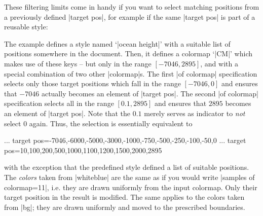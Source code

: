 {\begin{enumerate}
\begin{pgfplotskeylist}
            These filtering limits come in handy if you want to select matching
            positions from a previously defined |target pos|, for example if
            the same |target pos| is part of a reusable style:
\begin{codeexample}[width=8cm]
\pgfplotscolorbardrawstandalone[
  point meta min=-7046,
  point meta max=2895,
  colormap={whiteblue}{color=(blue) color=(white)},
  colormap={gb}{color=(green) color=(yellow)
      color=(brown)},
  colormap={CM}{
      of colormap={
        whiteblue,
        ocean height,
        target pos min*=
          \pgfkeysvalueof{/pgfplots/point meta min},
        target pos max=0,
        sample for=const,
      },
      of colormap={
        gb,
        ocean height,
        target pos min=0.1,
        target pos max*=
          \pgfkeysvalueof{/pgfplots/point meta max},
        sample for=const,
      },
  },
  colorbar horizontal,
  colormap access=const]
\end{codeexample}
            \noindent The example defines a style named `|ocean height|' with a
            suitable list of positions somewhere in the document. Then, it
            defines a colormap `|CM|' which makes use of these keys -- but only
            in the range $[-7046,2895]$, and with a special combination of two
            other |colormap|s. The first |of colormap| specification selects
            only those target positions which fall in the range $[-7046,0]$ and
            ensures that $-7046$ actually becomes an element of |target pos|.
            The second |of colormap| specification selects all in the range
            $[0.1,2895]$ and ensures that $2895$ becomes an element of
            |target pos|. Note that the $0.1$ merely serves as indicator to
            \emph{not} select $0$ again. Thus, the selection is essentially
            equivalent to
\begin{codeexample}
...
target pos={-7046,-6000,-5000,-3000,-1000,-750,-500,-250,-100,-50,0}
...
target pos={10,100,200,500,1000,1100,1200,1500,2000,2895}
\end{codeexample}
            with the exception that the predefined style defined a list of
            suitable positions. The \emph{colors} taken from |whiteblue| are
            the same as if you would write |samples of colormap={11}|, i.e.\@
            they are drawn uniformly from the input colormap. Only their
            target position in the result is modified. The same applies to
            the colors taken from |bg|; they are drawn uniformly and moved to
            the prescribed boundaries.


\end{pgfplotskeylist}
\end{enumerate}}
